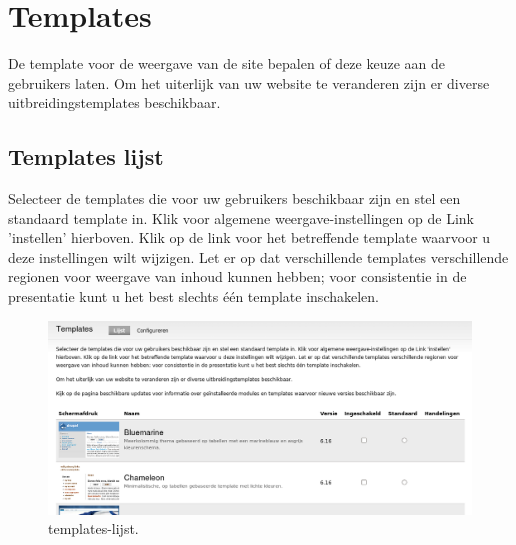\section{Templates} 
De template voor de weergave van de site bepalen of deze keuze aan de gebruikers
laten. Om het uiterlijk van uw website te veranderen zijn er diverse
uitbreidingstemplates beschikbaar.

\subsection{Templates lijst}
Selecteer de templates die voor uw gebruikers beschikbaar zijn en stel een
standaard template in. Klik voor algemene weergave-instellingen op de Link 'instellen' hierboven. 
Klik op de link voor het betreffende template waarvoor u deze instellingen wilt wijzigen. 
Let er op dat verschillende templates verschillende regionen voor weergave van inhoud kunnen hebben; 
voor consistentie in de presentatie kunt u het best slechts \'e\'en template
inschakelen. \begin{figure}[!h]
    \centering
   \includegraphics[scale=0.3,angle=0]{templates-lijst}
   \caption{templates-lijst.\label{white}}
 \end{figure}
 
